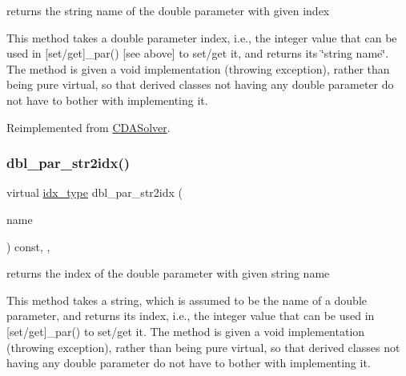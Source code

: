returns the string name of the double parameter with given index 

This method takes a double parameter index, i.\+e., the integer value that can be used in \mbox{[}set/get\mbox{]}\+\_\+par() \mbox{[}see above\mbox{]} to set/get it, and returns its \char`\"{}string name\char`\"{}. The method is given a void implementation (throwing exception), rather than being pure virtual, so that derived classes not having any double parameter do not have to bother with implementing it. 

Reimplemented from \mbox{\hyperlink{class_s_m_spp__di__unipi__it_1_1_c_d_a_solver_a93f1297e7910e91cc18b303376191026}{C\+D\+A\+Solver}}.

\mbox{\label{class_s_m_spp__di__unipi__it_1_1_m_c_f_solver_a6d353ac3d1200d9bea89235da61bc4f3}} 
\subsubsection{\texorpdfstring{dbl\+\_\+par\+\_\+str2idx()}{dbl\_par\_str2idx()}}
{\footnotesize\ttfamily virtual \mbox{\hyperlink{class_s_m_spp__di__unipi__it_1_1_thin_compute_interface_aa3d710629ad8c434286726ad810c3b47}{idx\+\_\+type}} dbl\+\_\+par\+\_\+str2idx (\begin{DoxyParamCaption}\item[{const std\+::string \&}]{name }\end{DoxyParamCaption}) const\hspace{0.3cm}{\ttfamily [inline]}, {\ttfamily [override]}, {\ttfamily [virtual]}}



returns the index of the double parameter with given string name 

This method takes a string, which is assumed to be the name of a double parameter, and returns its index, i.\+e., the integer value that can be used in \mbox{[}set/get\mbox{]}\+\_\+par() to set/get it. The method is given a void implementation (throwing exception), rather than being pure virtual, so that derived classes not having any double parameter do not have to bother with implementing it. 

